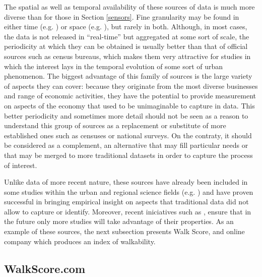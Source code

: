\documentclass[12pt]{article}
\begin{document}
The spatial as well as temporal availability of these sources of data is much
more diverse than for those in Section \ref{sensors}. Fine granularity may be
found in either time (e.g. \citealp{trulia}) or space (e.g.
\citealp{walkscore}), but rarely in both.
Although, in most cases, the data is not released in ``real-time'' but
aggregated at some sort of scale, the periodicity at which they can be
obtained is usually better than that of official sources such as census
bureaus, which makes them very attractive for studies in which the interest
lays in the temporal evolution of some sort of urban phenomenon.
The biggest advantage of this family of sources is the large variety of
aspects they can cover: because they originate from the most diverse
businesses and range of economic activities, they have the potential to
provide measurement on aspects of the economy that used to be unimaginable to
capture in data. 
This better periodicity and sometimes more detail should not be seen as a
reason to understand this group of sources as a
replacement or substitute of more established ones such as censuses or
national surveys. On the contraty, it should be considered as a complement, an
alternative that may fill particular needs or that may be merged to
more traditional datasets in order to capture the process of interest.

Unlike data of more recent nature, these sources have already been included in some studies
within the urban and regional science fields (e.g.
\citealp{avnimelech2011impact}) and have proven successful in bringing
empirical insight on aspects that traditional data did not allow to capture or
identify. Moreover, recent iniciatives such as
\cite{feldman2012data}, ensure that in the future only more studies will take
advantage of their properties. As an example of these sources, the next
subsection presents Walk Score, and online company which produces an index of
walkability.

\subsection{WalkScore.com}
\end{document}

